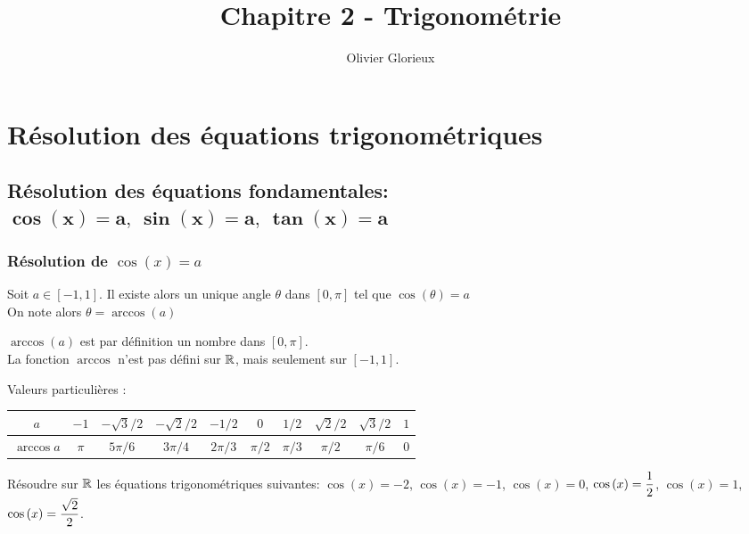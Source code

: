 \documentclass[a4paper, 11pt]{article}
\author{Olivier Glorieux}
\begin{document}
\tableofcontents
\title{Chapitre 2 - Trigonométrie}




\section{R\'esolution des \'equations trigonom\'etriques}

\subsection{R\'esolution des \'equations fondamentales: $\mathbf{\cos{(x)}=a,\ \sin{(x)}=a,\ \tan{(x)}=a}$}


\subsubsection{R\'esolution de $\cos{(x)}=a$}





\begin{prop}
Soit $a \in [-1,1]$. Il existe alors un unique angle $\theta$ dans $[0, \pi]$ tel que $ \cos(\theta)=a$\\
On note alors  $\theta = \arccos(a)$
\end{prop}
\warning  $\arccos (a)$ est par définition un nombre dans $[0,\pi]$.\\
\warning La fonction $\arccos$ n'est pas défini sur $\mathbb{R}$, mais seulement sur $[-1,1]$.


\vspace{0.5cm}
Valeurs particuli\`eres :\\
\begin{center}
\begin{tabular}{|c|c|c|c|c|c|c|c|c|c|}
\hline
\rule[-3mm]{0pt}{8mm}  $a$& $ -1$ & $-\sqrt{3}/2$ & $-\sqrt{2}/2$ & $-1/2$   &  $0$  & $1/2$ & $\sqrt{2}/2$&  $\sqrt{3}/2$&  $1$ \\ 
\hline
\rule[-3mm]{0pt}{8mm}  $\arccos{a}$ & $\pi$ & $5\pi/6$& $3\pi/4$  &$2\pi/3$   & $\pi/2$ &$\pi/3$&$\pi/2$&$\pi/6$&0 \\
\hline
\end{tabular}
\end{center}
\qquad



{\footnotesize
\begin{exo} R\'esoudre sur $\mathbb{R}$ les \'equations trigonom\'etriques suivantes: $\cos{(x)}=-2$, $\cos{(x)}=-1$, $\cos{(x)}=0$, $\displaystyle\cos{(x)}=\frac{1}{2}$, $\cos{(x)}=1$, $\displaystyle\cos{(x)}=\frac{\sqrt{2}}{2}$. 
\end{exo}}
\vspace{0.3cm}
\end{document}
